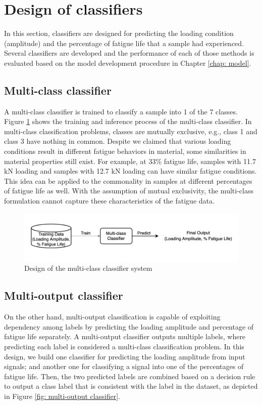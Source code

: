 \section{Design of classifiers}
\label{sec: design of classifiers}
In this section, classifiers are designed for predicting the loading condition (amplitude) and the percentage of fatigue life that a sample had experienced. Several classifiers are developed and the performance of each of those methods is evaluated based on the model development procedure in Chapter \ref{chap: model}.

\subsection{Multi-class classifier}
A multi-class classifier is trained to classify a sample into 1 of the 7 classes. Figure \ref{fig: multi-class classifier} shows the training and inference process of the multi-class classifier. In multi-class classification problems, classes are mutually exclusive, e.g., class 1 and class 3 have nothing in common. Despite we claimed that various loading conditions result in different fatigue behaviors in material, some similarities in material properties still exist. For example, at 33\% fatigue life, samples with 11.7 kN loading and samples with 12.7 kN loading can have similar fatigue conditions. This idea can be applied to the commonality in samples at different percentages of fatigue life as well. With the assumption of mutual exclusivity, the multi-class formulation cannot capture these characteristics of the fatigue data.

\begin{figure}[tb]
    \centering
    \includegraphics[width=0.9\linewidth]{fig/multi-class_classifier.png}
    \caption{Design of the multi-class classifier system}
    \label{fig: multi-class classifier}
\end{figure}

\subsection{Multi-output classifier}
\label{subsec: multi-output classifier}
On the other hand, multi-output classification is capable of exploiting dependency among labels \cite{multi-label-Zhang2014} by predicting the loading amplitude and percentage of fatigue life separately. A multi-output classifier outputs multiple labels, where predicting each label is considered a multi-class classification problem. In this design, we build one classifier for predicting the loading amplitude from input signals; and another one for classifying a signal into one of the percentages of fatigue life. Then, the two predicted labels are combined based on a decision rule to output a class label that is consistent with the label in the dataset, as depicted in Figure \ref{fig: multi-output classifier}. 

